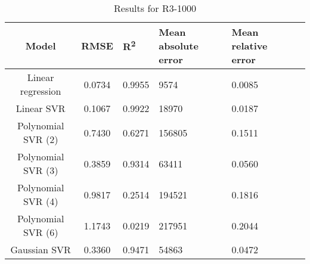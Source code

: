 \begin{table}[H]
\centering
\begin{adjustbox}{center}
\begin{tabular}{c | c M{1.2cm} M{2.5cm} M{2.5cm} M{1.8cm}}
Model & RMSE & R\textsuperscript{2} & Mean absolute error & Mean relative error \tabularnewline
\hline
Linear regression & 0.0734 & 0.9955 &   9574 & 0.0085 \\
Linear SVR & 0.1067 & 0.9922 &  18970 & 0.0187 \\
Polynomial SVR (2) & 0.7430 & 0.6271 & 156805 & 0.1511 \\
Polynomial SVR (3) & 0.3859 & 0.9314 &  63411 & 0.0560 \\
Polynomial SVR (4) & 0.9817 & 0.2514 & 194521 & 0.1816 \\
Polynomial SVR (6) & 1.1743 & 0.0219 & 217951 & 0.2044 \\
Gaussian SVR & 0.3360 & 0.9471 &  54863 & 0.0472 \\
\end{tabular}
\end{adjustbox}
\\
\caption{Results for R3-1000}
\label{tab:coreonly_linear_R3_1000}
\end{table}
